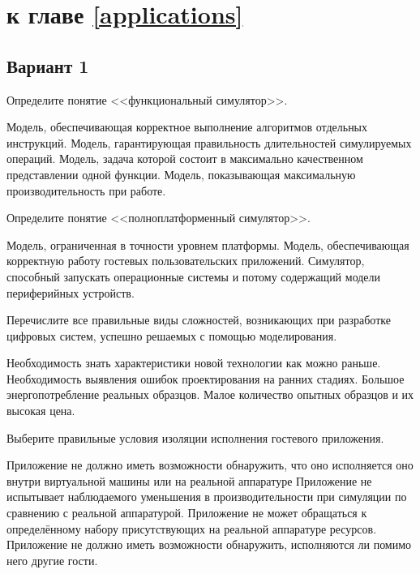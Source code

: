 \section{\Questions к главе \ref{applications}} %



\subsection*{Вариант 1}

\begin{questions}

\question[5] Определите понятие <<функциональный симулятор>>.
\begin{choices}
\correctchoice Модель, обеспечивающая корректное выполнение алгоритмов отдельных инструкций.
\choice Модель, гарантирующая правильность длительностей симулируемых операций.
\choice Модель, задача которой состоит в максимально качественном представлении одной функции.
\choice Модель, показывающая максимальную производительность при работе.
\end{choices}

\question[5] Определите понятие <<полноплатформенный симулятор>>.
\begin{choices}
\choice Модель, ограниченная в точности уровнем платформы.
\choice Модель, обеспечивающая корректную работу гостевых пользовательских приложений.
\correctchoice Симулятор, способный запускать операционные системы и потому содержащий модели периферийных устройств.
\end{choices}

\question[3] Перечислите все правильные виды сложностей, возникающих при разработке цифровых систем, успешно решаемых с помощью моделирования.
\begin{choices}
\correctchoice Необходимость знать характеристики новой технологии как можно раньше.
\correctchoice Необходимость выявления ошибок проектирования на ранних стадиях.
\choice Большое энергопотребление реальных образцов.
\correctchoice Малое количество опытных образцов и их высокая цена.
\end{choices}

\question[3] Выберите правильные условия изоляции исполнения гостевого приложения.
\begin{choices}
\correctchoice Приложение не должно иметь возможности обнаружить, что оно исполняется оно внутри виртуальной машины или на реальной аппаратуре
\choice Приложение не испытывает наблюдаемого уменьшения в производительности при симуляции по сравнению с реальной аппаратурой.
\choice Приложение не может обращаться к определённому набору присутствующих на реальной аппаратуре ресурсов.
\correctchoice Приложение не должно иметь возможности обнаружить, исполняются ли помимо него другие гости.
\end{choices}


\end{questions}
